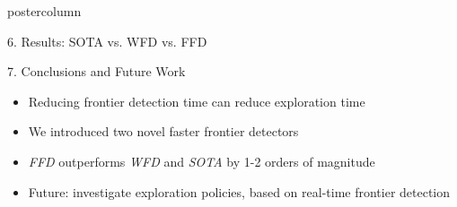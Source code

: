 \begin{beamercolorbox}[center,wd=\textwidth]{postercolumn}
\begin{minipage}[T]{.95\textwidth}
{\begin{block}{6. Results: SOTA vs. WFD vs. FFD}
            \end{block}
            \vfill
            \begin{block}{7. Conclusions and Future Work}
              \begin{itemize}
              \item Reducing frontier detection time can reduce exploration time
              \item We introduced two novel faster frontier detectors
              \item \emph{FFD} outperforms \emph{WFD} and \emph{SOTA}
              by 1-2 orders of magnitude
			  \item Future: investigate exploration policies, based on
			  real-time frontier detection
              \end{itemize}
            \end{block}
          }
        \end{minipage}
      \end{beamercolorbox}
